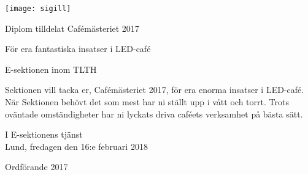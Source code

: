 \documentclass[12pt]{article}
\def\erik{Erik Månsson}
\def\longdate{fredagen den 16:e februari 2018}
\def\docauthor{\erik}
\begin{document}
\vspace*{2mm}

\begin{center}
    \texttt{[image: sigill]}\par
    \vspace*{6mm}
    {\Large Diplom tilldelat Cafémästeriet 2017}\par
    {\Large För era fantastiska insatser i LED-café}\par
    {\Large E-sektionen inom TLTH}\par
    \vspace*{1mm}
\end{center}

\vspace*{8mm}

Sektionen vill tacka er, Cafémästeriet 2017, för era enorma insatser i LED-café. När Sektionen behövt det som mest har ni ställt upp i vått och torrt. Trots oväntade omständigheter har ni lyckats driva caféets verksamhet på bästa sätt.

\begin{signatures}{1}
    I E-sektionens tjänst \\
    Lund, {\longdate}
    \signature{\docauthor}{Ordförande 2017}
\end{signatures}
\end{document}
